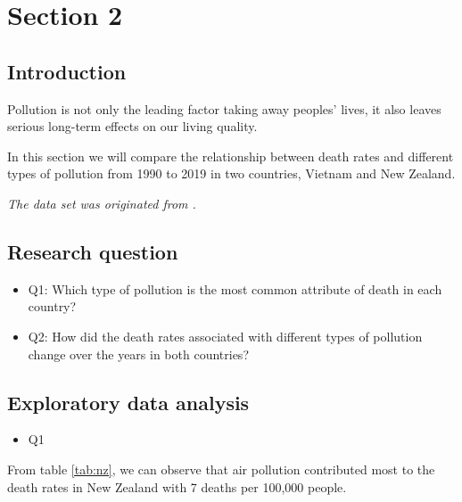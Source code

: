 \documentclass[11pt,a4paper,]{article}
\providecommand{\tightlist}{%
  \setlength{\itemsep}{0pt}\setlength{\parskip}{0pt}}
\begin{document}
\hypertarget{section-2}{%
\section{Section 2}\label{section-2}}

\hypertarget{introduction-1}{%
\subsection{Introduction}\label{introduction-1}}

Pollution is not only the leading factor taking away peoples' lives, it also leaves serious long-term effects on our living quality.

In this section we will compare the relationship between death rates and different types of pollution from 1990 to 2019 in two countries, Vietnam and New Zealand.

\emph{The data set was originated from \textcite{owidairpollution}.}

\hypertarget{research-question-1}{%
\subsection{Research question}\label{research-question-1}}

\begin{itemize}
\item
  Q1: Which type of pollution is the most common attribute of death in each country?
\item
  Q2: How did the death rates associated with different types of pollution change over the years in both countries?
\end{itemize}

\hypertarget{exploratory-data-analysis-1}{%
\subsection{Exploratory data analysis}\label{exploratory-data-analysis-1}}

\begin{itemize}
\tightlist
\item
  Q1
\end{itemize}

From table \ref{tab:nz}, we can observe that air pollution contributed most to the death rates in New Zealand with 7 deaths per 100,000 people.
\end{document}
